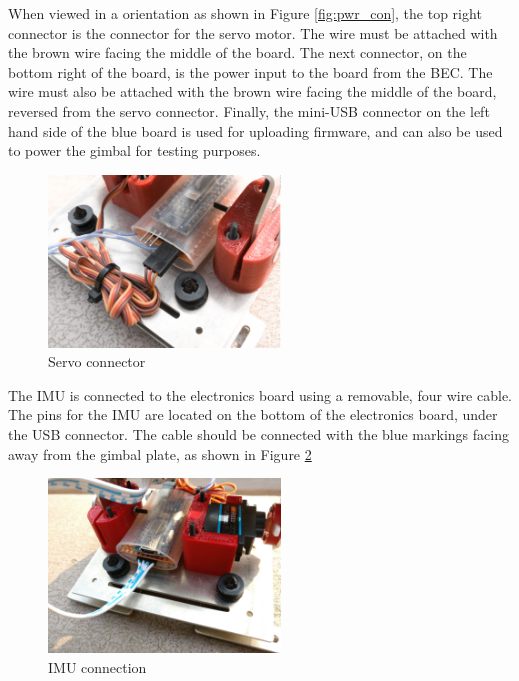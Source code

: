 \documentclass[11pt]{article} %
\begin{document}
When viewed in a orientation as shown in Figure \ref{fig:pwr_con}, the top right connector is the connector for the servo motor. The wire must be attached with the brown wire facing the middle of the board. The next connector, on the bottom right of the board, is the power input to the board from the BEC. The wire must also be attached with the brown wire facing the middle of the board, reversed from the servo connector. Finally, the mini-USB connector on the left hand side of the blue board is used for uploading firmware, and can also be used to power the gimbal for testing purposes. 
\begin{figure}[H]
\begin{centering}
\includegraphics[width = 0.55\textwidth]{Pictures/power.jpg}
\caption{Servo connector}
\label{fig:pwr}
\end{centering}
\end{figure}

The IMU is connected to the electronics board using a removable, four wire cable. The pins for the IMU are located on the bottom of the electronics board, under the USB connector. The cable should be connected with the blue markings facing away from the gimbal plate, as shown in Figure \ref{fig:imu}

\begin{figure}[H]
\begin{centering}
\includegraphics[width = 0.55\textwidth]{Pictures/nano_imu.jpg}
\caption{IMU connection}
\label{fig:imu}
\end{centering}
\end{figure}
\end{document}

